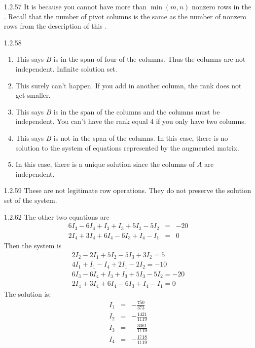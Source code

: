 \begin{Answer}{1.2.57}
It is because you cannot
have more than $\min \left( m,n\right) $ nonzero rows in the \rref. Recall that the number of pivot columns is the same as the
number of nonzero rows from the description of this \rref.
\end{Answer}
\begin{Answer}{1.2.58}
\begin{enumerate}
\item This says $B$ is in the span of four of the columns. Thus the columns are not independent. Infinite solution set.
\item This surely can't happen. If you add in another column, the rank does not get smaller.
\item This says $B$ is in the span of the columns and the columns must be
independent. You can't have the rank equal 4 if you only have two columns.
\item This says $B$ is not in the span of the columns. In this case, there is no solution to the system of equations represented by the augmented matrix.
\item In this case, there is a
unique solution since the columns of $A$ are independent.
\end{enumerate}
\end{Answer}
\begin{Answer}{1.2.59}
These are not legitimate row
operations. They do not preserve the solution set of the system.
\end{Answer}
\begin{Answer}{1.2.62}
The other two equations are
\begin{eqnarray*}
6I_{3}-6I_{4}+I_{3}+I_{3}+5I_{3}-5I_{2} &=&-20 \\
2I_{4}+3I_{4}+6I_{4}-6I_{3}+I_{4}-I_{1} &=&0
\end{eqnarray*}
Then the system is
\[
\begin{array}{c}
2I_{2}-2I_{1}+5I_{2}-5I_{3}+3I_{2}=5 \\
4I_{1}+I_{1}-I_{4}+2I_{1}-2I_{2}=-10 \\
6I_{3}-6I_{4}+I_{3}+I_{3}+5I_{3}-5I_{2}=-20 \\
2I_{4}+3I_{4}+6I_{4}-6I_{3}+I_{4}-I_{1}=0
\end{array}
\]
The solution is:
\begin{eqnarray*}
 I_{1}&=& -\frac{750}{373} \\
I_{2}&=& -\frac{1421}{1119} \\
I_{3}&=& -\frac{3061}{1119} \\
I_{4}&=& -\frac{1718}{1119}
\end{eqnarray*}
\end{Answer}
